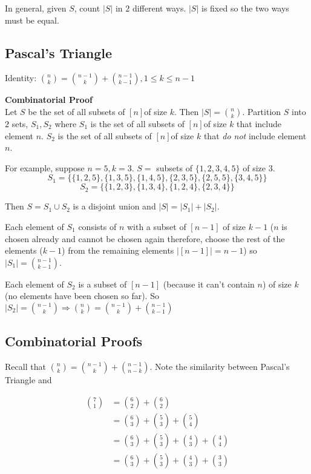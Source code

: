 \documentclass{article}
\newcommand{\setn}{$[n]$}
\newcommand{\oto}[1]{$[#1]$}
\newcommand{\union}{\cup}
\begin{document}
In general, given $S$, count $|S|$ in $2$ different ways. $|S|$ is fixed so the two ways must be equal.

\subsection{Pascal's Triangle}

Identity: $\binom nk = \binom {n-1}{k} + \binom {n-1}{k-1}, 1 \le k \le n-1$

\textbf{Combinatorial Proof\\}
Let $S$ be the set of all subsets of \setn of size $k$. Then $|S| = \binom nk$. Partition $S$ into $2$ sets, $S_1, S_2$ where $S_1$ is the set of all subsets of \setn of size $k$ that include element $n$. $S_2$ is the set of all subsets of \setn of size $k$ that \emph{do not} include element $n$.

For example, suppose $n=5, k=3$. $S= $ subsets of $\{1,2,3,4,5\}$ of size $3$.
$$S_1 = \{\{1,2,5\}, \{1,3,5\}, \{1,4,5\}, \{2,3,5\}, \{2,5,5\}, \{3,4,5\}\}$$
$$S_2 = \{\{1,2,3\}, \{1,3,4\}, \{1,2,4\}, \{2,3,4\}\}$$

Then $S= S_1 \union S_2$ is a disjoint union and $|S| = |S_1| + |S_2|$.

Each element of $S_1$ consists of $n$ with a subset of \oto{n-1} of size $k-1$ ($n$ is chosen already and cannot be chosen again therefore, choose the rest of the elements ($k-1$) from the remaining elements $|[n-1]| = n-1$) so $|S_1| = \binom {n-1}{k-1}$.

Each element of $S_2$ is a subset of \oto{n-1} (because it can't contain $n$) of size $k$ (no elements have been chosen so far). So $|S_2| = \binom {n-1}k \Rightarrow \binom nk = \binom {n-1}k + \binom {n-1}{k-1}$



\subsection{Combinatorial Proofs}
Recall that $\binom nk = \binom {n-1}k + \binom {n-1}{n-k}$. Note the similarity between Pascal's Triangle and 

\begin{align*}
	\binom 71 & = \binom 62 + \binom 62 \\
	& = \binom 63 + \binom 53 + \binom 54 \\
	& = \binom 63 + \binom 53 + \binom 43 + \binom 44 \\
	& = \binom 63 + \binom 53 + \binom 43 + \binom 33	
\end{align*}
\end{document}
